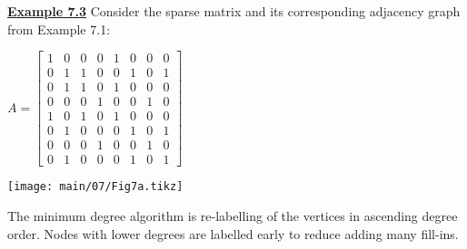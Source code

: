   \newpage
  {\bf\underline {Example 7.3}}
  \vskip 2pt
  \noindent
  Consider the sparse matrix and its corresponding adjacency graph from Example
  7.1:
  \noindent
  \begin{table}[H]
    \begin{minipage}[]{0.50\linewidth}
      \begin{center}
        $A=
        \begin{bmatrix}
          1 & 0 & 0 & 0 & 1 & 0 & 0 & 0 \\
          0 & 1 & 1 & 0 & 0 & 1 & 0 & 1 \\
          0 & 1 & 1 & 0 & 1 & 0 & 0 & 0 \\
          0 & 0 & 0 & 1 & 0 & 0 & 1 & 0 \\
          1 & 0 & 1 & 0 & 1 & 0 & 0 & 0 \\
          0 & 1 & 0 & 0 & 0 & 1 & 0 & 1 \\
          0 & 0 & 0 & 1 & 0 & 0 & 1 & 0 \\
          0 & 1 & 0 & 0 & 0 & 1 & 0 & 1
       \end{bmatrix}$
      \end{center}
    \end{minipage}
    \begin{minipage}[]{0.49\linewidth}
      \begin{center}
        \texttt{[image: main/07/Fig7a.tikz]}
      \end{center}
    \end{minipage}
  \end{table}
  
  The minimum degree algorithm is re-labelling of the vertices in ascending degree
  order. Nodes with lower degrees are labelled early to reduce adding many
  fill-ins.
  

